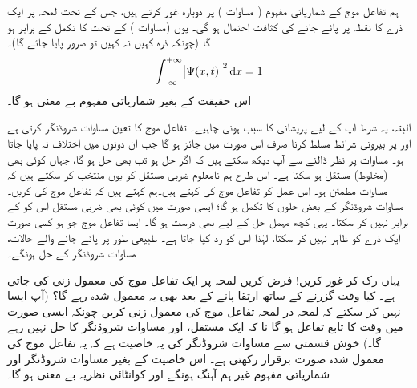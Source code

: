 ہم تفاعل موج کے شماریاتی مفہوم ( مساوات ) پر دوبارہ غور کرتے ہیں، جس کے تحت لمحہ  پر ایک ذرے کا نقطہ  پر پائے جانے کی کثافت احتمال  ہو گی۔ یوں (مساوات ) کے تحت  کا تکمل  کے برابر ہو گا (چونکہ ذرہ کہیں نہ کہیں تو ضرور پایا جائے گا)۔ 
\begin{align}\label{مساوات_تفاعل_موج_احتمال_اکائی}
\int_{-\infty}^{+\infty}\abs{\Psi(x,t)}^2\dif x = 1
\end{align}
اس حقیقت کے بغیر شماریاتی مفہوم بے معنی ہو گا۔ 

البتہ، یہ شرط آپ کے لیے پریشانی کا سبب ہونی چاہیے۔ تفاعل موج کا تعین مساوات شروڈنگر کرتی ہے اور  پر بیرونی شرائط مسلط کرنا صرف اس صورت میں جائز ہو گا جب ان دونوں میں اختلاف نہ پایا جاتا ہو۔ مساوات  پر نظر ڈالنے سے آپ دیکھ سکتے ہیں کہ اگر  حل ہو تب  بھی حل ہو گا، جہاں  کوئی بھی (مخلوط) مستقل ہو سکتا ہے۔ اس طرح ہم نامعلوم ضربی مستقل کو یوں منتخب کر سکتے ہیں کہ مساوات  مطمئن ہو۔ اس عمل کو تفاعل موج کی  کہتے ہیں۔ہم کہتے ہیں کہ تفاعل موج کی  کریں۔ مساوات شروڈنگر کے بعض حلوں کا تکمل  ہو گا؛ ایسی صورت میں کوئی بھی ضربی مستقل اس کو  کے برابر نہیں کر سکتا۔ یہی کچھ مہمل حل  کے لیے بھی درست ہو گا۔ ایسا تفاعل موج جو  ہو کسی صورت ایک ذرے کو ظاہر نہیں کر سکتا، لہٰذا اس کو رد کیا جاتا ہے۔ طبیعی طور پر پائے جانے والے حالات، مساوات شروڈنگر کے  حل ہونگے۔

 یہاں رک کر غور کریں! فرض کریں لمحہ  پر ایک تفاعل موج کی معمول زنی کی جاتی ہے۔ کیا وقت گزرنے کے ساتھ  ارتقا پانے کے بعد بھی یہ معمول شدہ رہے گا؟ (آپ ایسا نہیں کر سکتے کہ لمحہ در لمحہ تفاعل موج کی معمول زنی کریں چونکہ ایسی صورت میں  وقت  کا تابع تفاعل ہو گا نا کہ ایک مستقل، اور  مساوات شروڈنگر کا حل نہیں رہے گا۔) خوش قسمتی سے مساوات شروڈنگر کی یہ خاصیت ہے کہ یہ تفاعل موج کی معمول شدہ صورت برقرار رکھتی ہے۔ اس خاصیت کے بغیر مساوات شروڈنگر اور شماریاتی مفہوم غیر ہم آہنگ ہونگے اور کوانٹائی نظریہ بے معنی ہو گا۔

